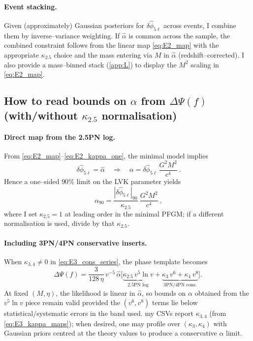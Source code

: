 \documentclass{iopjournal}
\begin{document}
\paragraph{Event stacking.}
Given (approximately) Gaussian posteriors for $\delta\hat\phi_{5\ell}$ across events, I combine them by inverse–variance weighting. If \(\widehat\alpha\) is common across the sample, the combined constraint follows from the linear map \eqref{eq:E2_map} with the appropriate \(\kappa_{2.5}\) choice and the mass entering via $M$ in \(\widehat\alpha\) (redshift–corrected). I also provide a mass–binned stack (\cref{app:L}) to display the $M^{2}$ scaling in \eqref{eq:E2_map}.

\subsection{\texorpdfstring{How to read bounds on $\alpha$ from $\Delta\Psi(f)$ (with/without $\kappa_{2.5}$ normalisation)}{How to read bounds on alpha from DeltaPsi(f) (with/without kappa 2.5 normalisation)}}\label{app:E5}
\paragraph{Direct map from the 2.5PN log.}
From \eqref{eq:E2_map}–\eqref{eq:E2_kappa_one}, the minimal model implies
\begin{equation}
\boxed{\ \delta\hat\phi_{5\ell}=\widehat\alpha\quad\Rightarrow\quad
\alpha=\delta\hat\phi_{5\ell}\,\frac{G^{2}M^{2}}{c^{4}}\ } .
\label{eq:E5_minimal}
\end{equation}
Hence a one–sided $90\%$ limit on the LVK parameter yields
\begin{equation}
\boxed{\ \alpha_{90}=\frac{|\delta\hat\phi_{5\ell}|_{90}}{\kappa_{2.5}}\ \frac{G^{2}M^{2}}{c^{4}}\ }\!,
\label{eq:E5_alpha_bound}
\end{equation}
where I set $\kappa_{2.5}=1$ at leading order in the minimal PFGM; if a different normalisation is used, divide by that \(\kappa_{2.5}\).

\paragraph{Including 3PN/4PN conservative inserts.}
When \(\kappa_{3,4}\neq0\) in \eqref{eq:E3_cons_series}, the phase template becomes
\begin{equation}
\Delta\Psi(f)=\frac{3}{128\,\eta}\,v^{-5}\,\widehat\alpha\Big[\underbrace{\kappa_{2.5}\,v^{5}\ln v}_{\text{2.5PN log}}+\underbrace{\kappa_{3}\,v^{6}+\kappa_{4}\,v^{8}}_{\text{3PN/4PN cons.}}\Big].
\label{eq:E5_full_template}
\end{equation}
At fixed $(M,\eta)$, the likelihood is linear in $\widehat\alpha$, so bounds on $\alpha$ obtained from the $v^{5}\ln v$ piece remain valid provided the $(v^{6},v^{8})$ terms lie below statistical/systematic errors in the band used. my CSVs report $\kappa_{3,4}$ (from \eqref{eq:E3_kappa_maps}); when desired, one may profile over $(\kappa_{3},\kappa_{4})$ with Gaussian priors centred at the theory values to produce a conservative $\alpha$ limit.
\end{document}
